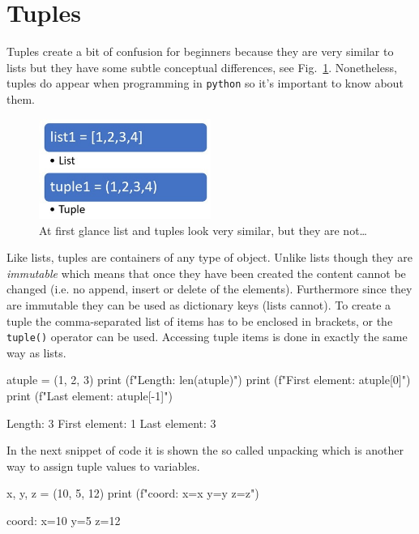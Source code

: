 \section{Tuples}\label{tuples}

Tuples create a bit of confusion for beginners because they are very similar to lists but they have some subtle conceptual differences, see Fig.~\ref{fig:tuples}. Nonetheless, tuples do appear when programming in \texttt{python} so it's important to know about them.

\begin{figure}[hb]
\centering
\includegraphics[width=0.5\textwidth]{figures/Difference-Between-List-and-Tuple-fig-1-2.jpg}
\caption{At first glance list and tuples look very similar, but they are not\ldots}
\label{fig:tuples}
\end{figure}

Like lists, tuples are containers of any type of object. Unlike lists though they are \emph{immutable} which means that once they have been created the content cannot be changed (i.e. no append, insert or delete of the elements). Furthermore since they are immutable they can be used as dictionary keys (lists cannot). To create a tuple the comma-separated list of items has to be enclosed in brackets, or the \texttt{tuple()} operator can be used. Accessing tuple items is done in exactly the same way as lists.

\begin{ipython}
atuple = (1, 2, 3)
print (f"Length: {len(atuple)}")
print (f"First element: {atuple[0]}")
print (f"Last element: {atuple[-1]}")
\end{ipython}
\begin{ioutput}
Length: 3
First element: 1
Last element: 3
\end{ioutput}

In the next snippet of code it is shown the so called unpacking which is another way to assign tuple values to variables.

\begin{ipython}
x, y, z = (10, 5, 12)
print (f"coord: x={x} y={y} z={z}")
\end{ipython}
\begin{ioutput}
coord: x=10 y=5 z=12
\end{ioutput}

